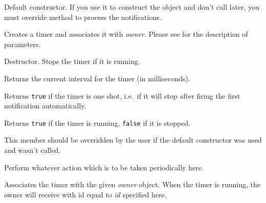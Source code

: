 Default constructor. If you use it to construct the object and don't call 
 later, you must override 
 method to process the notifications.


Creates a timer and associates it with {\it owner}. Please see 
 for the description of parameters.

\label{wxtimerdtor}


Destructor. Stops the timer if it is running.

\label{wxtimergetinterval}


Returns the current interval for the timer (in milliseconds).

\label{wxtimerisoneshot}


Returns {\tt true} if the timer is one shot, i.e.\ if it will stop after firing the
first notification automatically.

\label{wxtimerisrunning}


Returns {\tt true} if the timer is running, {\tt false} if it is stopped.

\label{wxtimernotify}


This member should be overridden by the user if the default constructor was
used and  wasn't called.

Perform whatever action which is to be taken periodically here.

\label{wxtimersetowner}


Associates the timer with the given {\it owner}\/ object. When the timer is
running, the owner will receive  with
id equal to {\it id}\/ specified here.

